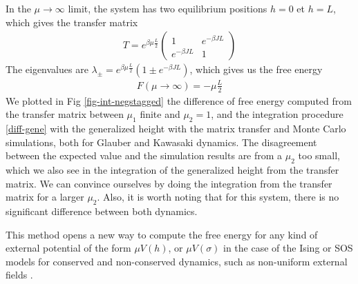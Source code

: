 {In the $\mu \rightarrow \infty$ limit, the system has two equilibrium positions $h=0$ et $h=L$, which gives the transfer matrix
\begin{align}
T= e^{\beta \mu \frac{L}{2}}
  \begin{pmatrix}
    1 & e^{-\beta  J L} \\
    e^{-\beta  J L} & 1
  \end{pmatrix}
\end{align}
The eigenvalues are $\lambda_\pm = e^{ \beta \mu \frac{L}{2}}( 1 \pm e^{-\beta J L})$, which gives us the free energy 
\begin{align}
  F(\mu \rightarrow \infty) = - \mu \frac{L}{2}
\end{align}
We plotted in Fig \ref{fig-int-negstagged} the difference of free energy computed from the transfer matrix between $\mu_1$ finite and $\mu_2=1$, and the integration procedure \eqref{diff-gene} with the generalized height with the matrix transfer and Monte Carlo simulations, both for Glauber and Kawasaki dynamics. The disagreement between the expected value and the simulation results are from a $\mu_2$ too small, which we also see in the integration of the generalized height from the transfer matrix. We can convince ourselves by doing the integration from the transfer matrix for a larger $\mu_2$. Also, it is worth noting that for this system, there is no significant difference between both dynamics.

This method opens a new way to compute the free energy for any kind of external potential of the form $\mu V(h)$, or $\mu V(\sigma)$ in the case of the Ising or SOS models for conserved and non-conserved dynamics, such as non-uniform external fields \cite{bissacot_phase_2010}. 
}


